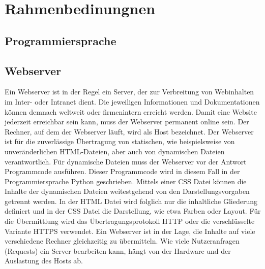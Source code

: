 
\chapter{Rahmenbedinungnen}

\section{Programmiersprache}

\section{Webserver}

Ein Webserver ist in der Regel ein Server, der zur Verbreitung von Webinhalten im Inter- oder Intranet dient. Die jeweiligen Informationen und Dokumentationen können demnach weltweit oder firmenintern erreicht werden. Damit eine Website jederzeit erreichbar sein kann, muss der Webserver permanent online sein.
Der Rechner, auf dem der Webserver läuft, wird als Host bezeichnet. Der Webserver ist für die zuverlässige Übertragung von statischen, wie beispielsweise von unveränderlichen \ac{HTML}-Dateien, aber auch von dynamischen Dateien verantwortlich. Für dynamische Dateien muss der Webserver vor der Antwort Programmcode ausführen. Dieser Programmcode wird in diesem Fall in der Programmiersprache Python geschrieben. Mittels einer \ac{CSS} Datei können die Inhalte der dynamischen Dateien weitestgehend von den Darstellungsvorgaben getrennt werden. In der \ac{HTML} Datei wird folglich nur die inhaltliche Gliederung definiert und in der \ac{CSS} Datei die Darstellung, wie etwa Farben oder Layout.
Für die Übermittlung wird das Übertragungsprotokoll \ac{HTTP} oder die verschlüsselte Variante \ac{HTTPS} verwendet.
Ein Webserver ist in der Lage, die Inhalte auf viele verschiedene Rechner gleichzeitig zu übermitteln. Wie viele Nutzeranfragen (Requests) ein Server bearbeiten kann, hängt von der Hardware und der Auslastung des Hosts ab.

